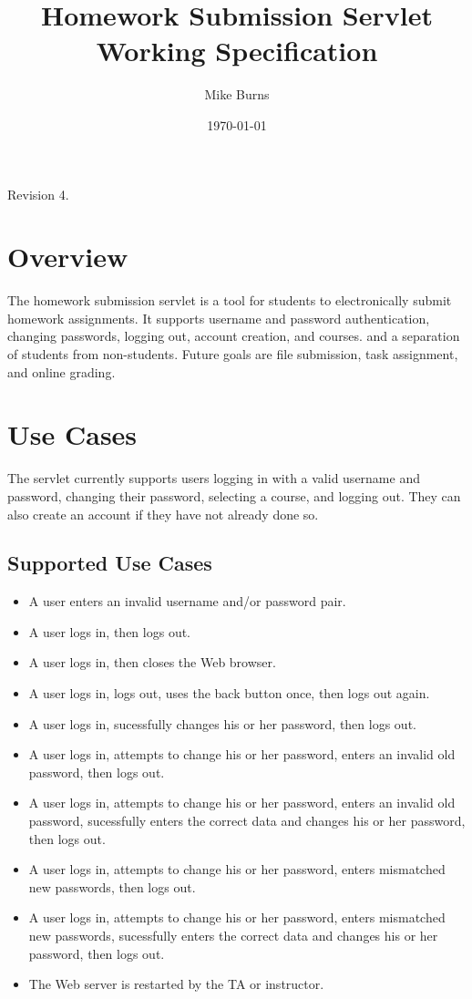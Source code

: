 \documentclass[a4paper]{article}
\begin{document}
\title{Homework Submission Servlet Working Specification}
\author{Mike Burns}
\date{\today}

\maketitle

Revision 4.

\section{Overview}\label{sec:overview}

The homework submission servlet is a tool for students to electronically submit
homework assignments. It supports username and password authentication,
changing passwords, logging out, account creation, and courses.  and a
separation of students from non-students. Future goals are file submission,
task assignment, and online grading.

\section{Use Cases}\label{sec:usecases}

The servlet currently supports users logging in with a valid username and
password, changing their password, selecting a course, and logging out. They
can also create an account if they have not already done so.

\subsection{Supported Use Cases}\label{subsec:detailed-usecases}

\begin{itemize}
\item{A user enters an invalid username and/or password pair.}
\item{A user logs in, then logs out.}
\item{A user logs in, then closes the Web browser.}
\item{A user logs in, logs out, uses the back button once, then logs out again.}
\item{A user logs in, sucessfully changes his or her password, then logs out.}
\item{A user logs in, attempts to change his or her password, enters an invalid
old password, then logs out.}
\item{A user logs in, attempts to change his or her password, enters an invalid
old password, sucessfully enters the correct data and changes his or her password,
then logs out.}
\item{A user logs in, attempts to change his or her password, enters mismatched
new passwords, then logs out.}
\item{A user logs in, attempts to change his or her password, enters mismatched
new passwords, sucessfully enters the correct data and changes his or her password,
then logs out.}
\item{The Web server is restarted by the TA or instructor.}
\end{itemize}
\end{document}
